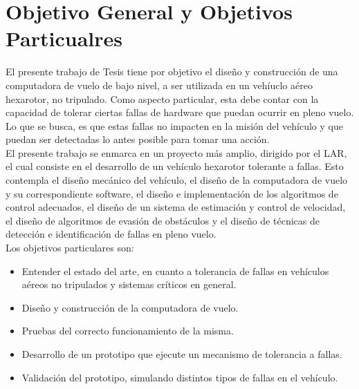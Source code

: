 \section{Objetivo General y Objetivos Particualres}

El presente trabajo de Tesis tiene por objetivo el diseño y construcción de una computadora de vuelo de bajo nivel, a ser utilizada en un vehíuclo aéreo hexarotor, no tripulado. Como aspecto particular, esta debe contar con la capacidad de tolerar ciertas fallas de hardware que puedan ocurrir en pleno vuelo. Lo que se busca, es que estas fallas no impacten en la misión del vehículo y que puedan ser detectadas lo antes posible para tomar una acción.\\

El presente trabajo se enmarca en un proyecto más amplio, dirigido por el LAR, el cual consiste en el desarrollo de un vehículo hexarotor tolerante a fallas. Esto contempla el diseño mecánico del vehículo, el diseño de la computadora de vuelo y su correspondiente software, el diseño e implementación de los algoritmos de control adecuados, el diseño de un sistema de estimación y control de velocidad, el diseño de algoritmos de evasión de obstáculos y el diseño de técnicas de detección e identificación de fallas en pleno vuelo.\\

Los objetivos particulares son:

\begin{itemize}
    \item Entender el estado del arte, en cuanto a tolerancia de fallas en vehículos aéreos no tripulados y sistemas críticos en general.
    \item Diseño y construcción de la computadora de vuelo.
    \item Pruebas del correcto funcionamiento de la misma.
    \item Desarrollo de un prototipo que ejecute un mecanismo de tolerancia a fallas.
    \item Validación del prototipo, simulando distintos tipos de fallas en el vehículo.
\end{itemize}